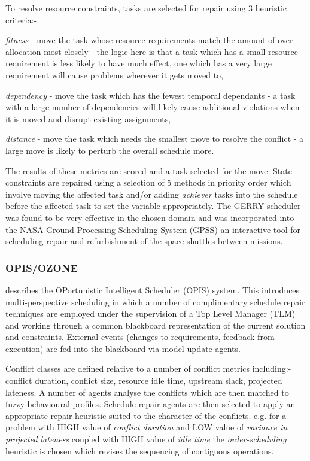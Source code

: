 To resolve resource constraints, tasks are selected for repair using 3 heuristic criteria:- \begin{inparaenum} \item \emph{fitness} - move the task whose resource requirements match the amount of over-allocation most closely - the logic here is that a task which has a small resource requirement is less likely to have much effect, one which has a very large requirement will cause problems wherever it gets moved to, \item \emph{dependency} - move the task which has the fewest temporal dependants - a task with a large number of dependencies will likely cause additional violations when it is moved and disrupt existing assignments, \item \emph{distance} - move the task which needs the smallest move to resolve the conflict - a large move is likely to perturb the overall schedule more.\end{inparaenum} The results of these metrics are scored and a task selected for the move. State constraints are repaired using a selection of 5 methods in priority order which involve moving the affected task and/or adding \emph{achiever} tasks into the schedule before the affected task to set the variable appropriately. The GERRY scheduler was found to be very effective in the chosen domain and was incorporated into the NASA Ground Processing Scheduling System (GPSS) an interactive tool for scheduling repair and refurbishment of the space shuttles between missions. 


\subsubsection{OPIS/OZONE}
\label{sect:review_opis}
\citet{smith95reactive} describes the OPortunistic Intelligent Scheduler (OPIS) system. This introduces multi-perspective scheduling in which a number of complimentary schedule repair techniques are employed under the supervision of a Top Level Manager (TLM) and working through a common blackboard representation of the current solution and constraints. External events (changes to requirements, feedback from execution) are fed into the blackboard via model update agents. 

Conflict classes are defined relative to a number of conflict metrics including:- conflict duration, conflict size, resource idle time, upstream slack, projected lateness. A number of agents analyse the conflicts which are then matched to fuzzy behavioural profiles. Schedule repair agents are then selected to apply an appropriate repair heuristic suited to the character of the conflicts. e.g. for a problem with HIGH value of \emph{conflict duration} and LOW value of \emph{variance in projected lateness} coupled with HIGH value of \emph{idle time} the \emph{order-scheduling} heuristic is chosen which revises the sequencing of contiguous operations. 

